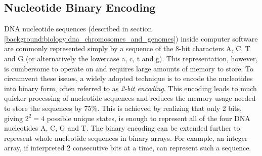 \subsection{Nucleotide Binary Encoding} \label{background:nucleotide_binary_encoding}
DNA nucleotide sequences (described in section \ref{background:biology:dna_chromosomes_and_genomes}) inside computer software are commonly represented simply by a sequence of the 8-bit characters A, C, T and G (or alternatively the lowercase a, c, t and g).
This representation, however, is cumbersome to operate on and requires large amounts of memory to store.
To circumvent these issues, a widely adopted technique is to encode the nucleotides into binary form, often referred to as \textit{2-bit encoding}.
This encoding leads to much quicker processing of nucleotide sequences and reduces the memory usage needed to store the sequences by 75\%.
This is achieved by realizing that only 2 bits, giving \textit{$2^2=4$} possible unique states, is enough to represent all of the four DNA nucleotides A, C, G and T.
The binary encoding can be extended further to represent whole nucleotide sequences in binary arrays.
For example, an integer array, if interpreted 2 consecutive bits at a time, can represent such a sequence.

